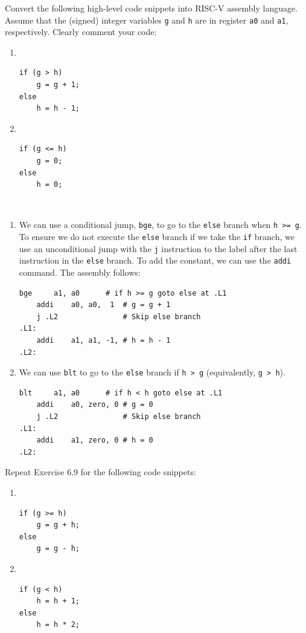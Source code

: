 \documentclass[12pt]{article}
\newenvironment{ex}[2][Exercise]{\begin{trivlist}
		\item[\hskip \labelsep {\bfseries #1}\hskip \labelsep {\bfseries #2.}]}{\end{trivlist}}
\newenvironment{sol}[1][Solution]{\begin{trivlist}
		\item[\hskip \labelsep {\bfseries #1:}]}{\end{trivlist}}
\begin{document}
\begin{ex}{6.9}
	Convert the following high-level code snippets into RISC-V assembly language. Assume that the (signed)
	integer variables \texttt{g} and \texttt{h} are in register \texttt{a0} and \texttt{a1}, respectively.
	Clearly comment your code:
	\begin{enumerate}[label=(\alph*)]
		\item 
		\
		\begin{lstlisting}
if (g > h)
	g = g + 1;
else
	h = h - 1;
		\end{lstlisting}
		\item
		\
		\begin{lstlisting}
if (g <= h)
	g = 0;
else
	h = 0;
		\end{lstlisting}
	\end{enumerate}
\end{ex}

\begin{sol}
	\
	\begin{enumerate}[label=(\alph*)]
		\item We can use a conditional jump, \texttt{bge}, to go to the \texttt{else} branch when \texttt{h >= g}.
		To ensure we do not execute the \texttt{else} branch if we take the \texttt{if} branch, we use
		an unconditional jump with the \texttt{j} instruction to the label after the last instruction in the
		\texttt{else} branch. To add the constant, we can use the \texttt{addi} command. The assembly follows:
		\begin{lstlisting}[language={}]
	bge		a1, a0		# if h >= g goto else at .L1
	addi	a0, a0,  1	# g = g + 1
	j .L2				# Skip else branch
.L1: 
	addi	a1, a1, -1,	# h = h - 1
.L2:
		\end{lstlisting}
		\item We can use \texttt{blt} to go to the \texttt{else} branch if \texttt{h > g} (equivalently,
		\texttt{g > h}).
		\begin{lstlisting}[language={}]
	blt		a1, a0		# if h < h goto else at .L1
	addi 	a0, zero, 0	# g = 0
	j .L2				# Skip else branch
.L1:
	addi	a1, zero, 0 # h = 0
.L2:
		\end{lstlisting}
	\end{enumerate}
\end{sol}

\begin{ex}{6.10}
	Repeat Exercise 6.9 for the following code snippets:
	\begin{enumerate}[label=(\alph*)]
		\item 
		\
		\begin{lstlisting}
if (g >= h)
	g = g + h;
else
	g = g - h;
		\end{lstlisting}
		\item 
		\
		\begin{lstlisting}
if (g < h)
	h = h + 1;
else
	h = h * 2;
		\end{lstlisting}
	\end{enumerate}
\end{ex}
\end{document}
